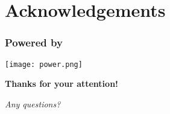 \documentclass[UTF8,table]{ctexbeamer}
\begin{document}
\section*{Acknowledgements}
\begin{frame}
	\frametitle{Powered by}
	\begin{center}
		\texttt{[image: power.png]}
	\end{center}
\end{frame}

\begin{frame}[plain]
	\begin{spacing}{1.5}	
		\begin{center}
			\Huge{\textbf{Thanks for your attention!}}
			
			\Huge{\textit{Any questions?}}
		\end{center}
	\end{spacing}	
\end{frame}
\end{document}
